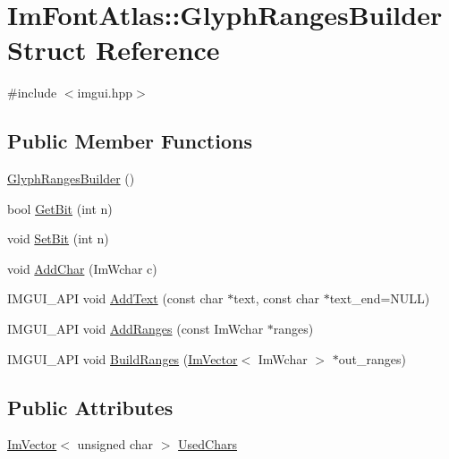 \hypertarget{struct_im_font_atlas_1_1_glyph_ranges_builder}{}\section{Im\+Font\+Atlas\+:\+:Glyph\+Ranges\+Builder Struct Reference}
\label{struct_im_font_atlas_1_1_glyph_ranges_builder}


{\ttfamily \#include $<$imgui.\+hpp$>$}

\subsection*{Public Member Functions}
\begin{DoxyCompactItemize}
\item 
\hyperlink{struct_im_font_atlas_1_1_glyph_ranges_builder_a3c8d81e21a62329830d4c36ca4a1fbc3}{Glyph\+Ranges\+Builder} ()
\item 
bool \hyperlink{struct_im_font_atlas_1_1_glyph_ranges_builder_a157a4d95c361d717c073d5815d576eb5}{Get\+Bit} (int n)
\item 
void \hyperlink{struct_im_font_atlas_1_1_glyph_ranges_builder_aff570c016f17c1cd8d3a819b5f7a056c}{Set\+Bit} (int n)
\item 
void \hyperlink{struct_im_font_atlas_1_1_glyph_ranges_builder_a6b6b18e5c5fc4366afc98ff7391ba0bf}{Add\+Char} (Im\+Wchar c)
\item 
I\+M\+G\+U\+I\+\_\+\+A\+PI void \hyperlink{struct_im_font_atlas_1_1_glyph_ranges_builder_a6c0f9756dc8ea184920d5ff28bfdb669}{Add\+Text} (const char $\ast$text, const char $\ast$text\+\_\+end=N\+U\+LL)
\item 
I\+M\+G\+U\+I\+\_\+\+A\+PI void \hyperlink{struct_im_font_atlas_1_1_glyph_ranges_builder_a93174d62f8cf366528b654806ca7be49}{Add\+Ranges} (const Im\+Wchar $\ast$ranges)
\item 
I\+M\+G\+U\+I\+\_\+\+A\+PI void \hyperlink{struct_im_font_atlas_1_1_glyph_ranges_builder_aa55b5710971adef2e4c690a3e46de6d5}{Build\+Ranges} (\hyperlink{class_im_vector}{Im\+Vector}$<$ Im\+Wchar $>$ $\ast$out\+\_\+ranges)
\end{DoxyCompactItemize}
\subsection*{Public Attributes}
\begin{DoxyCompactItemize}
\item 
\hyperlink{class_im_vector}{Im\+Vector}$<$ unsigned char $>$ \hyperlink{struct_im_font_atlas_1_1_glyph_ranges_builder_a369924c3fbeeac0402a6c02d62dd4a71}{Used\+Chars}
\end{DoxyCompactItemize}


